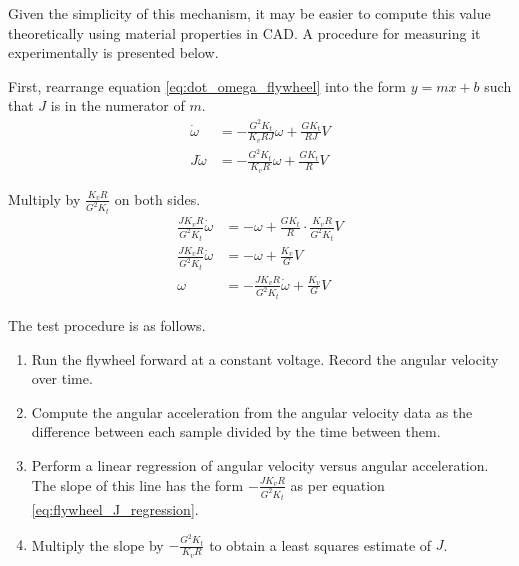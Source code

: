 Given the simplicity of this mechanism, it may be easier to compute this value
theoretically using material properties in CAD. A procedure for measuring it
experimentally is presented below.

First, rearrange equation \eqref{eq:dot_omega_flywheel} into the form
$y = mx + b$ such that $J$ is in the numerator of $m$.
\begin{align*}
  \dot{\omega} &= -\frac{G^2 K_t}{K_v RJ} \omega + \frac{G K_t}{RJ} V \\
  J\dot{\omega} &= -\frac{G^2 K_t}{K_v R} \omega + \frac{G K_t}{R} V
\end{align*}

Multiply by $\frac{K_v R}{G^2 K_t}$ on both sides.
\begin{align}
  \frac{J K_v R}{G^2 K_t} \dot{\omega} &= -\omega + \frac{G K_t}{R} \cdot
    \frac{K_v R}{G^2 K_t} V \nonumber \\
  \frac{J K_v R}{G^2 K_t} \dot{\omega} &= -\omega + \frac{K_v}{G} V \nonumber \\
  \omega &= -\frac{J K_v R}{G^2 K_t} \dot{\omega} + \frac{K_v}{G} V
    \label{eq:flywheel_J_regression}
\end{align}

The test procedure is as follows.
\begin{enumerate}
  \item Run the flywheel forward at a constant voltage. Record the angular
    velocity over time.
  \item Compute the angular acceleration from the angular velocity data as the
    difference between each sample divided by the time between them.
  \item Perform a linear regression of angular velocity versus angular
    acceleration. The slope of this line has the form $-\frac{J K_v R}{G^2 K_t}$
    as per equation \eqref{eq:flywheel_J_regression}.
  \item Multiply the slope by $-\frac{G^2 K_t}{K_v R}$ to obtain a least squares
    estimate of $J$.
\end{enumerate}
